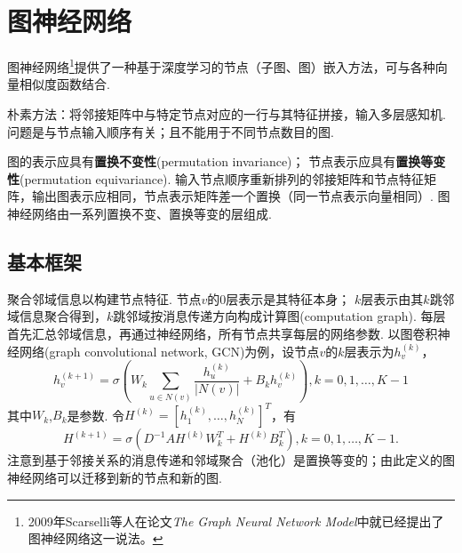 \section{图神经网络}

\par 图神经网络\footnote{2009年Scarselli等人在论文\emph{The Graph Neural Network Model}中就已经提出了图神经网络这一说法。}提供了一种基于深度学习的节点（子图、图）嵌入方法，可与各种向量相似度函数结合. 

\par 朴素方法：将邻接矩阵中与特定节点对应的一行与其特征拼接，输入多层感知机. 问题是与节点输入顺序有关；且不能用于不同节点数目的图. 

\par 图的表示应具有\textbf{置换不变性}(permutation invariance)； 节点表示应具有\textbf{置换等变性}(permutation equivariance). 输入节点顺序重新排列的邻接矩阵和节点特征矩阵，输出图表示应相同，节点表示矩阵差一个置换（同一节点表示向量相同）. 图神经网络由一系列置换不变、置换等变的层组成. 

\subsection{基本框架}
\par 聚合邻域信息以构建节点特征. 节点$v$的0层表示是其特征本身； $k$层表示由其$k$跳邻域信息聚合得到，$k$跳邻域按消息传递方向构成计算图(computation graph). 每层首先汇总邻域信息，再通过神经网络，所有节点共享每层的网络参数. 以图卷积神经网络(graph convolutional network, GCN)为例，设节点$v$的$k$层表示为$h_v^{(k)}$，
\begin{equation}
    h_v^{(k+1)}=\sigma(W_k\sum_{u\in N(v)}\frac{h_u^{(k)}}{\vert N(v)\vert}+B_k h_v^{(k)}), k=0,1,\dots,K-1
\end{equation}
其中$W_k$,$B_k$是参数. 令$H^{(k)}=[h_1^{(k)},\dots, h_N^{(k)}]^T$，有
\begin{equation}
H^{(k+1)}=\sigma(D^{-1}AH^{(k)}W_k^T+H^{(k)}B_k^T), k=0,1,\dots,K-1.
\end{equation}
注意到基于邻接关系的消息传递和邻域聚合（池化）是置换等变的；由此定义的图神经网络可以迁移到新的节点和新的图. 

